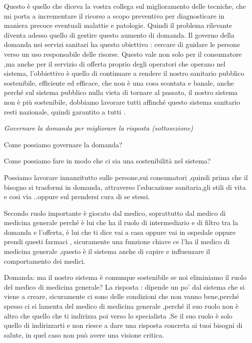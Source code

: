 \documentclass[]{article}
\begin{document}
Questo è quello che diceva la vostra collega sul miglioramento delle
tecniche, che mi porta a incrementare il ricorso a scopo preventivo per
diagnosticare in maniera precoce eventuali malattie e patologie. Quindi
il problema rilevante diventa adesso quello di gestire questo aumento di
domanda. Il governo della domanda nei servizi sanitari ha questo
obiettivo : cercare di guidare le persone verso un uso responsabile
delle risorse. Questo vale non solo per il consumatore ,ma anche per il
servizio di offerta proprio degli operatori che operano nel sistema,
l'obbiettivo è quello di continuare a rendere il nostro sanitario
pubblico sostenibile, efficiente ed efficace, che non è una cosa
scontata e banale, anche perché sul sistema pubblico nulla vieta di
tornare al passato, il nostro sistema non è più sostenibile, dobbiamo
lavorare tutti affinché questo sistema sanitario resti nazionale, quindi
garantito a tutti .

\emph{Governare la domanda per migliorare la risposta (sottosezione)}

Come possiamo governare la domanda?

Come possiamo fare in modo che ci sia una sostenibilità nel sistema?

Possiamo lavorare innanzitutto sulle persone,sui consumatori ,quindi
prima che il bisogno si trasformi in domanda, attraverso l'educazione
sanitaria,gli stili di vita e cosi via ..oppure sul prendersi cura di se
stessi.

Secondo ruolo importante è giocato dal medico, soprattutto dal medico di
medicina generale perché è lui che ha il ruolo di intermediario e di
filtro tra la domanda e l'offerta, è lui che ti dice vai a casa oppure
vai in ospedale oppure prendi questi farmaci , sicuramente una funzione
chiave ce l'ha il medico di medicina generale ,questo è il sistema anche
di capire e influenzare il comportamento dei medici.

Domanda: ma il nostro sistema è comunque sostenibile se noi eliminiamo
il ruolo del medico di medicina generale? La risposta : dipende un po'
dal sistema che si viene a creare, sicuramente ci sono delle condizioni
che non vanno bene,perché spesso ci si lamenta del medico di medicina
generale ,perché il suo ruolo non è altro che quello che ti indirizza
poi verso lo specialista .Se il suo ruolo è solo quello di indirizzarti
e non riesce a dare una risposta concreta ai tuoi bisogni di salute, in
quel caso non può avere una visione critica.
\end{document}
